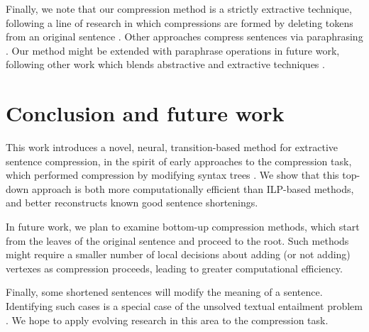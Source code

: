 \documentclass[11pt,a4paper]{article}
\begin{document}
Finally, we note that our compression method is a strictly extractive technique, following a line of research in which compressions are formed by deleting tokens from an original sentence \cite{clarke2008global,filippova2008dependency,filippova2015sentence}. Other approaches compress sentences via paraphrasing \cite{rush2015neural,mallinson18}. Our method might be extended with paraphrase operations in future work, following other work which blends abstractive and extractive techniques \cite{P17-1099}. 

\section{Conclusion and future work}

This work introduces a novel, neural, transition-based method for extractive sentence compression, in the spirit of early approaches to the compression task, which performed compression by modifying syntax trees \cite{Jing2000SentenceRF,Knight2000StatisticsBasedS}. We show that this top-down approach is both more computationally efficient than ILP-based methods, and better reconstructs known good sentence shortenings. 

In future work, we plan to examine bottom-up compression methods, which start from the leaves of the original sentence and proceed to the root. Such methods might require a smaller number of local decisions about adding (or not adding) vertexes as compression proceeds, leading to greater computational efficiency.

Finally, some shortened sentences will modify the meaning of a sentence. Identifying such cases is a special case of the unsolved textual entailment problem \cite{snli_bowman,Pavlick2016SoCalledNA,linzencompression}. We hope to apply evolving research in this area to the compression task.  







\end{document}
